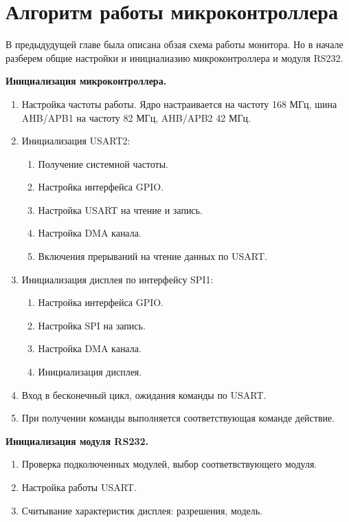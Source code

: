 \chapter{Алгоритм работы микроконтроллера}

	В предыдудущей главе была описана обзая схема работы монитора. Но в начале разберем общие настройки и инициалиазию микроконтроллера и модуля RS232.
	
	\textbf{Инициализация микроконтроллера.}
	
	\begin{enumerate}
		\item Настройка частоты работы. Ядро настраивается на частоту 168 МГц, шина AHB/APB1 на частоту 82 МГц, AHB/APB2 42 МГц.
		\item Инициализация USART2:
		\begin{enumerate}
			\item Получение системной частоты.
			\item Настройка интерфейса GPIO.
			\item Настройка USART на чтение и запись.
			\item Настройка DMA канала.
			\item Включения прерываний на чтение данных по USART.
		\end{enumerate}
		\item Инициализация дисплея по интерфейсу SPI1:
		\begin{enumerate}
			\item Настройка интерфейса GPIO.
			\item Настройка SPI на запись.
			\item Настройка DMA канала.
			\item Инициализация дисплея.
		\end{enumerate}
		\item Вход в бесконечный цикл, ожидания команды по USART.
		\item При получении команды выполняется соответствующая команде действие.
	\end{enumerate}
	
	\textbf{Инициализация модуля RS232.}
	
	\begin{enumerate}
		\item Проверка подколюченных модулей, выбор соответвствующего модуля.
		\item Настройка работы USART.
		\item Считывание характеристик дисплея: разрешения, модель.
	\end{enumerate}
	
